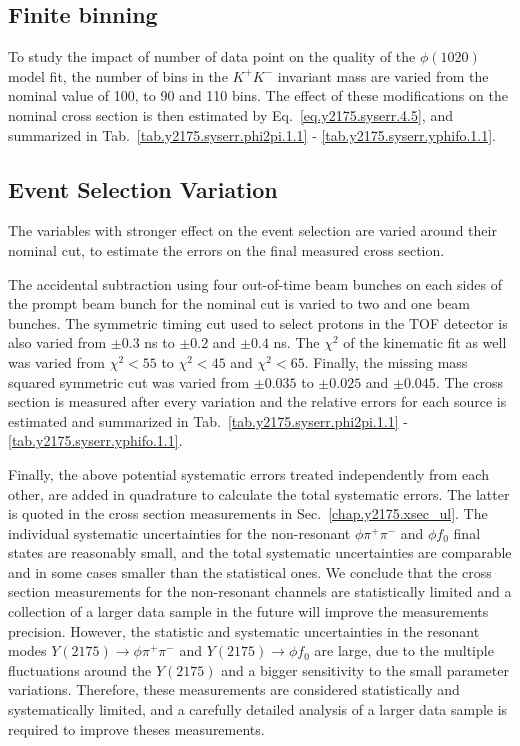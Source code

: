 \subsection{Finite binning}
\label{chap.y2175.syserr.bin}

To study the impact of number of data point on the quality of the $\phi(1020)$ model fit, the number of bins in the $K^+K^-$ invariant mass are varied from the nominal value of 100, to 90 and 110 bins. The effect of these modifications on the nominal cross section is then estimated by Eq.~\ref{eq.y2175.syserr.4.5}, and summarized in Tab.~\ref{tab.y2175.syserr.phi2pi.1.1} - \ref{tab.y2175.syserr.yphifo.1.1}.

\subsection{Event Selection Variation}
\label{chap.y2175.syserr.evt}

The variables with stronger effect on the event selection are varied around their nominal cut, to estimate the errors on the final measured cross section.
\par The accidental subtraction using four out-of-time beam bunches on each sides of the prompt beam bunch for the nominal cut is varied to two and one beam bunches. The symmetric timing cut used to select protons in the TOF detector is also varied from $\pm 0.3$ ns to $\pm 0.2$ and $\pm 0.4$ ns. The $\chi^2$ of the kinematic fit as well was varied from $\chi^{2}<55$ to $\chi^{2}<45$ and $\chi^{2}<65$. Finally, the missing mass squared symmetric cut was varied from $\pm 0.035$ to $\pm 0.025$ and $\pm 0.045$. The cross section is measured after every variation and the relative errors for each source is estimated and summarized in Tab.~\ref{tab.y2175.syserr.phi2pi.1.1} - \ref{tab.y2175.syserr.yphifo.1.1}.
~\par Finally, the above potential systematic errors treated independently from each other, are added in quadrature to calculate the total systematic errors. The latter is quoted in the cross section measurements in Sec.~\ref{chap.y2175.xsec_ul}. The individual systematic uncertainties for the non-resonant $\phi \pi^{+} \pi^{-}$ and $\phi f_0$ final states are reasonably small, and the total systematic uncertainties are comparable and in some cases smaller than the statistical ones. We conclude that the cross section measurements for the non-resonant channels are statistically limited and a collection of a larger data sample in the future will improve the measurements precision. However, the statistic and systematic uncertainties in the resonant modes $Y(2175) \rightarrow \phi \pi^{+} \pi^{-}$ and $Y(2175) \rightarrow \phi f_0$ are large, due to the multiple fluctuations around the $Y(2175)$ and a bigger sensitivity to the small parameter variations. Therefore, these measurements are considered statistically and systematically limited, and a carefully detailed analysis of a larger data sample is required to improve theses measurements.

